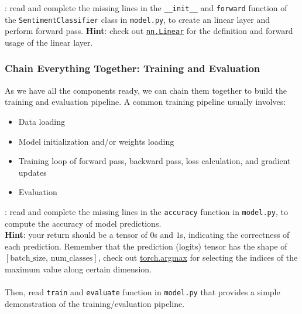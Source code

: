 \noindent\todo{}: read and complete the missing lines in the \texttt{\_\_init\_\_} and \texttt{forward} function of the \texttt{SentimentClassifier} class in \texttt{model.py}, to create an linear layer and perform forward pass.
\noindent \textbf{Hint}: check out \href{https://pytorch.org/docs/stable/generated/torch.nn.Linear.html}{\texttt{nn.Linear}} for the definition and forward usage of the linear layer.

\subsubsection{Chain Everything Together: Training and Evaluation} \noindent As we have all the components ready, we can chain them together to build the training and evaluation pipeline. A common training pipeline usually involves:
\begin{itemize}
    \item Data loading
    \item Model initialization and/or weights loading
    \item Training loop of forward pass, backward pass, loss calculation, and gradient updates
    \item Evaluation
\end{itemize}

\noindent \todo{}: read and complete the missing lines in the \texttt{accuracy} function in \texttt{model.py}, to compute the accuracy of model predictions.\\
\noindent \textbf{Hint}: your return should be a tensor of $0$s and $1$s, indicating the correctness of each prediction. Remember that the prediction (logits) tensor has the shape of $[\text{batch\_size}, \, \text{num\_classes}]$, check out \href{https://pytorch.org/docs/stable/generated/torch.argmax.html}{torch.argmax} for selecting the indices of the maximum value along certain dimension.\\\\
Then, read \texttt{train} and \texttt{evaluate} function in \texttt{model.py} that provides a simple demonstration of the training/evaluation pipeline.

